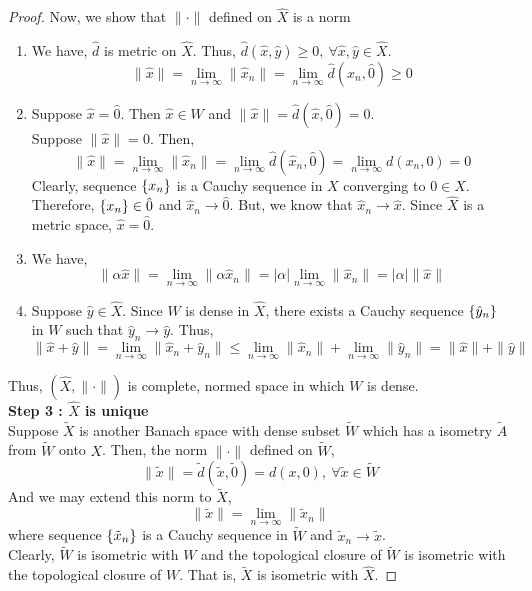 \begin{proof}
	Now, we show that $\| \cdot \|$ defined on $\hat{X}$ is a norm
	\begin{enumerate}
		\item We have, $\hat{d}$ is metric on $\hat{X}$. Thus, $\hat{d}(\hat{x},\hat{y}) \ge 0,\ \forall \hat{x},\hat{y} \in \hat{X}$.
			\[ \| \hat{x} \| = \lim_{n \to \infty} \| \hat{x}_n \| = \lim_{n \to \infty} \hat{d}(\hat{x}_n,\hat{0}) \ge 0 \]
		\item Suppose $\hat{x} = \hat{0}$.
			Then $\hat{x} \in W$ and $\|\hat{x}\| = \hat{d}(\hat{x},\hat{0}) = 0$.\\
			Suppose $\|\hat{x}\| = 0$.
			Then,
			\[ \| \hat{x} \| = \lim_{n \to \infty} \| \hat{x}_n \| = \lim_{n \to \infty} \hat{d}(\hat{x}_n,\hat{0}) = \lim_{n \to \infty} d(x_n,0) = 0 \]
			Clearly, sequence $\left\{x_n\right\}$ is a Cauchy sequence in $X$ converging to $0 \in X$.
			Therefore, $\left\{x_n\right\} \in \hat{0}$ and $\hat{x}_n \to \hat{0}$.
			But, we know that $\hat{x}_n \to \hat{x}$.
			Since $\hat{X}$ is a metric space, $\hat{x} = \hat{0}$.
		\item We have,
			\[ \| \alpha \hat{x} \| = \lim_{n \to \infty} \| \alpha \hat{x}_n \| = |\alpha|\lim_{n \to \infty} \| \hat{x}_n \| = |\alpha|\|\hat{x}\| \]
		\item Suppose $\hat{y} \in \hat{X}$.
			Since $W$ is dense in $\hat{X}$, there exists a Cauchy sequence $\left\{\hat{y}_n\right\}$ in $W$ such that $\hat{y}_n \to \hat{y}$.
			Thus,
			\[ \| \hat{x} + \hat{y} \| = \lim_{n \to \infty} \| \hat{x}_n + \hat{y}_n \| \le \lim_{n \to \infty} \| \hat{x}_n \| + \lim_{n \to \infty} \| \hat{y}_n \| = \| \hat{x} \| + \| \hat{y} \| \]
	\end{enumerate}
	Thus, $(\hat{X},\|\cdot\|)$ is complete, normed space in which $W$ is dense.\\

	\textbf{Step 3 : $\hat{X}$ is unique}\\
	Suppose $\tilde{X}$ is another Banach space with dense subset $\tilde{W}$ which has a isometry $\tilde{A}$ from $\tilde{W}$ onto $X$.
	Then, the norm $\|\cdot\|$ defined on $\tilde{W}$,
	\[ \| \tilde{x} \| = \tilde{d}(\tilde{x},\tilde{0}) = d(x,0),\ \forall \tilde{x} \in \tilde{W} \]
	And we may extend this norm to $\tilde{X}$,
	\[ \| \tilde{x} \| = \lim_{n \to \infty} \| \tilde{x}_n \| \]
	where sequence $\left\{\tilde{x}_n\right\}$ is a Cauchy sequence in $\tilde{W}$ and $\tilde{x}_n \to \tilde{x}$.\\

	Clearly, $\tilde{W}$ is isometric with $W$ and the topological closure of $\tilde{W}$ is isometric with the topological closure of $W$.
	That is, $\tilde{X}$ is isometric with $\hat{X}$.
\end{proof}

